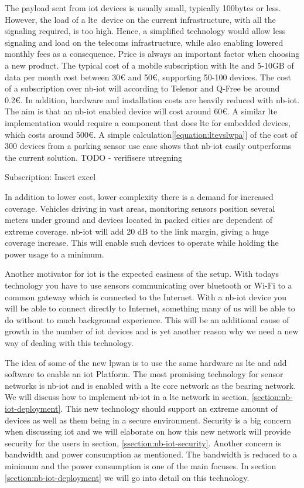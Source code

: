 \documentclass[USenglish]{ifimaster}  %
\begin{document}
The payload sent from \acrshort{iot} devices is usually small, typically 100bytes or less. However, the load of a \acrshort{lte} device on the current infrastructure, with all the signaling required, is too high. Hence, a simplified technology would allow less signaling and load on the telecoms infrastructure, while also enabling lowered monthly fees as a consequence. Price is always an important factor when choosing a new product. The typical cost of a mobile subscription with \acrshort{lte} and 5-10GB of data per month cost between 30€ and 50€, supporting 50-100 devices. The cost of a subscription over \acrshort{nb-iot} will according to Telenor and Q-Free be around 0.2€. In addition, hardware and installation costs are heavily reduced with \acrshort{nb-iot}. The aim is that an \acrshort{nb-iot} enabled device will cost around 60€. A similar \acrshort{lte} implementation would require a component that does \acrshort{lte} for embedded devices, which costs around 500€. A simple calculation[\ref{equation:ltevslwpa}] of the cost of 300 devices from a parking sensor use case shows that \acrshort{nb-iot} easily outperforms the current solution. TODO - verifisere utregning

Subscription: \label{equation:ltevslwpa}
Insert excel

In addition to lower cost, lower complexity there is a demand for increased coverage. Vehicles driving in vast areas, monitoring sensors position several meters under ground and devices located in packed cities are dependent of extreme coverage. \acrshort{nb-iot} will add 20 dB to the link margin, giving a huge coverage increase. This will enable such devices to operate while holding the power usage to a minimum.

Another motivator for \acrshort{iot} is the expected easiness of the setup. With todays technology you have to use sensors communicating over bluetooth or Wi-Fi to a common gateway which is connected to the Internet. With a \acrshort{nb-iot} device you will be able to connect directly to Internet, something many of us will be able to do without to much background experience. This will be an additional cause of growth in the number of \acrshort{iot} devices and is yet another reason why we need a new way of dealing with this technology.

The idea of some of the new \acrfull{lpwan} is to use the same hardware as \acrshort{lte} and add software to enable an \acrshort{iot} Platform. The most promising technology for sensor networks is \acrfull{nb-iot} and is enabled with a \acrshort{lte} core network as the bearing network. We will discuss how to implement \acrshort{nb-iot} in a \acrshort{lte} network in section, \vref{section:nb-iot-deployment}. This new technology should support an extreme amount of devices as well as them being in a secure environment. Security is a big concern when discussing \acrshort{iot} and we will elaborate on how this new network will provide security for the users in section, \vref{ssection:nb-iot-security}. Another concern is bandwidth and power consumption as mentioned. The bandwidth is reduced to a minimum and the power consumption is one of the main focuses. In section \ref{section:nb-iot-deployment} we will go into detail on this technology.
\end{document}
